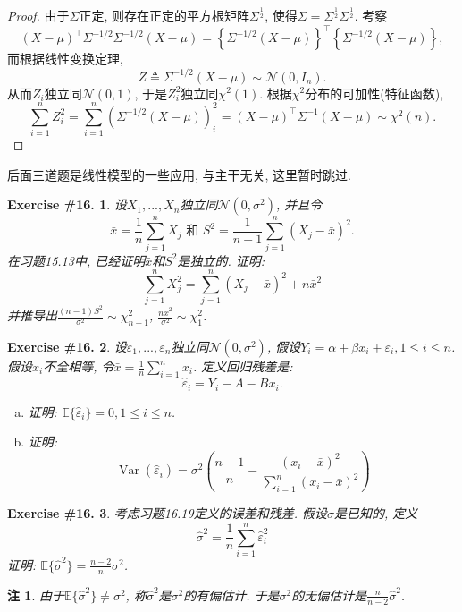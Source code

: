 \documentclass[UTF8, a4paper]{article}
\newtheorem{exercise}{Exercise \#16.}
\newtheorem*{remark}{注}
\begin{document}
\begin{proof}
由于\(\Sigma\)正定, 则存在正定的平方根矩阵\(\Sigma^{\frac{1}{2}}\), 使得\(\Sigma = \Sigma^{\frac{1}{2}}\Sigma^{\frac{1}{2}}\).
考察 
$$
(X-\mu)^\top \Sigma^{-1/2} \Sigma^{-1/2}(X-\mu) = \left\{\Sigma^{-1/2}(X-\mu)\right\}^\top \left\{\Sigma^{-1/2}(X-\mu)\right\} ,
$$
而根据线性变换定理, 
$$
Z\triangleq \Sigma^{-1/2}(X-\mu) \sim \mathcal{N}(0, I_n).
$$
从而\(Z_i\)独立同\(\mathcal{N}(0, 1)\), 于是\(Z_i^2\)独立同\(\chi^2(1)\).
根据\(\chi^2\)分布的可加性(特征函数), 
$$
\sum_{i=1}^{n}Z_i^2 = \sum_{i=1}^{n}\left(\Sigma^{-1/2}(X-\mu)\right)_i^2 = (X-\mu)^\top \Sigma^{-1}(X-\mu) \sim \chi^2(n).
$$
\end{proof}


后面三道题是线性模型的一些应用, 与主干无关, 这里暂时跳过.
\begin{exercise}
设\(X_1, ..., X_n\)独立同\(\mathcal{N}(0, \sigma^2)\), 并且令
$$
\bar{x}=\frac{1}{n} \sum_{j=1}^n X_j \text { 和 } S^2=\frac{1}{n-1} \sum_{j=1}^n\left(X_j-\bar{x}\right)^2 .
$$
在习题15.13中, 已经证明\(\bar{x}\)和\(S^2\)是独立的.
证明: $$
\sum_{j=1}^n X_j^2=\sum_{j=1}^n\left(X_j-\bar{x}\right)^2+n \bar{x}^2
$$
并推导出\(\frac{(n-1)S^2}{\sigma^2}\sim \chi_{n-1}^2\), \(\frac{n \bar{x}^2}{\sigma^2} \sim \chi_1^2\).
\end{exercise}


\begin{exercise}
设\(\varepsilon_1,...,\varepsilon_n\)独立同\(\mathcal{N}(0, \sigma^2)\), 假设\(Y_i =  \alpha + \beta x_i + \varepsilon_i, 1 \leq i \leq n\).
假设\(x_i\)不全相等, 令\(\bar{x} = \frac{1}{n}\sum_{i = 1}^n x_i\).
定义回归残差是:
$$
\hat{\varepsilon}_i=Y_i-A-B x_i.
$$
\begin{enumerate}[a)]
    \item 证明: \(\mathbb{E}\{\hat{\varepsilon}_i\} = 0, 1\leq i\leq n\).
    \item 证明: $$
\operatorname{Var}\left(\hat{\varepsilon}_i\right)=\sigma^2\left(\frac{n-1}{n}-\frac{\left(x_i-\bar{x}\right)^2}{\sum_{i=1}^n\left(x_i-\bar{x}\right)^2}\right)
$$
\end{enumerate}
\end{exercise}

\begin{exercise}
考虑习题16.19定义的误差和残差. 假设\(\sigma\)是已知的, 定义
$$
\hat{\sigma}^2=\frac{1}{n} \sum_{i=1}^n \hat{\varepsilon}_i^2
$$
证明: \(\mathbb{E}\{\hat{\sigma}^2\} = \frac{n-2}{n}\sigma^2\).
\end{exercise}
\begin{remark}
由于\(\mathbb{E}\{\hat{\sigma}^2\} \neq \sigma^2\), 称\(\hat{\sigma}^2\)是\(\sigma^2\)的有偏估计.
于是\(\sigma^2\)的无偏估计是\(\frac{n}{n-2}\hat{\sigma}^2\).
\end{remark}
\end{document}
